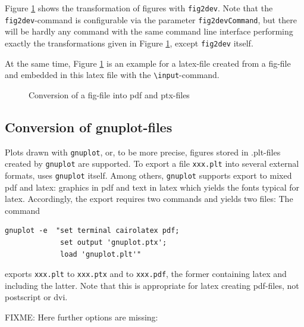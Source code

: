 \documentclass[12pt]{article}
\begin{document}
Figure \ref{fig:fig2dev} shows the transformation 
of figures with {\tt fig2dev}. 
Note that the {\tt fig2dev}-command is configurable 
via the parameter {\tt fig2devCommand}, 
but there will be hardly any command with the same command line interface 
performing exactly the transformations given in Figure \ref{fig:fig2dev}, 
except {\tt fig2dev} itself. 

At the same time, Figure \ref{fig:fig2dev} is an example 
for a latex-file created from a fig-file 
and embedded in this latex file 
with the {\tt\textbackslash input}-command. 


\begin{figure}[htb]
\begin{center}

\end{center}
\caption{\label{fig:fig2dev}Conversion of a fig-file into pdf and ptx-files}
\end{figure}


\subsection{Conversion of gnuplot-files}\label{subsec:gnuplot2pdf}

Plots drawn with {\tt gnuplot}, or, to be more precise, 
figures stored in .plt-files created by {\tt gnuplot} are supported. 
To export a file {\tt xxx.plt} into several external formats, 
uses {\tt gnuplot} itself. 
Among others, {\tt gnuplot} supports export to mixed pdf and latex: 
graphics in pdf and text in latex which yields the fonts typical for latex. 
Accordingly, the export requires two commands and yields two files: 
The command 
%
\begin{verbatim}
gnuplot -e  "set terminal cairolatex pdf;
             set output 'gnuplot.ptx';
             load 'gnuplot.plt'"
\end{verbatim}
%
exports {\tt xxx.plt} to {\tt xxx.ptx} and to {\tt xxx.pdf}, 
the former containing latex and including the latter. 
Note that this is appropriate for latex creating pdf-files, 
not postscript or dvi. 

FIXME: 
Here further options are missing: 
\end{document}
